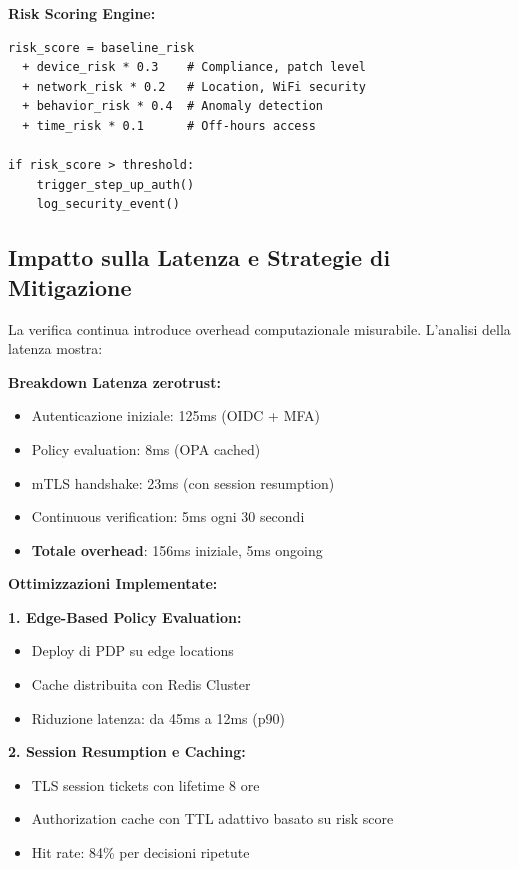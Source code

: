 \textbf{Risk Scoring Engine:}
\begin{lstlisting}[caption={Calcolo Risk Score real-time},label={lst:risk_score}]
risk_score = baseline_risk
  + device_risk * 0.3    # Compliance, patch level
  + network_risk * 0.2   # Location, WiFi security  
  + behavior_risk * 0.4  # Anomaly detection
  + time_risk * 0.1      # Off-hours access

if risk_score > threshold:
    trigger_step_up_auth()
    log_security_event()
\end{lstlisting}

\subsection{\texorpdfstring{Impatto sulla Latenza e Strategie di Mitigazione}{3.5.4 - Impatto sulla Latenza e Strategie di Mitigazione}}

La verifica continua introduce overhead computazionale misurabile. L'analisi della latenza mostra:

\textbf{Breakdown Latenza \gls{zerotrust}:}
\begin{itemize}
    \item Autenticazione iniziale: 125ms (OIDC + MFA)
    \item Policy evaluation: 8ms (OPA cached)
    \item mTLS handshake: 23ms (con session resumption)
    \item Continuous verification: 5ms ogni 30 secondi
    \item \textbf{Totale overhead}: 156ms iniziale, 5ms ongoing
\end{itemize}

\textbf{Ottimizzazioni Implementate:}

\textbf{1. Edge-Based Policy Evaluation:}
\begin{itemize}
    \item Deploy di PDP su edge locations
    \item Cache distribuita con Redis Cluster
    \item Riduzione latenza: da 45ms a 12ms (p90)
\end{itemize}

\textbf{2. Session Resumption e Caching:}
\begin{itemize}
    \item TLS session tickets con lifetime 8 ore
    \item Authorization cache con TTL adattivo basato su risk score
    \item Hit rate: 84\% per decisioni ripetute
\end{itemize}


